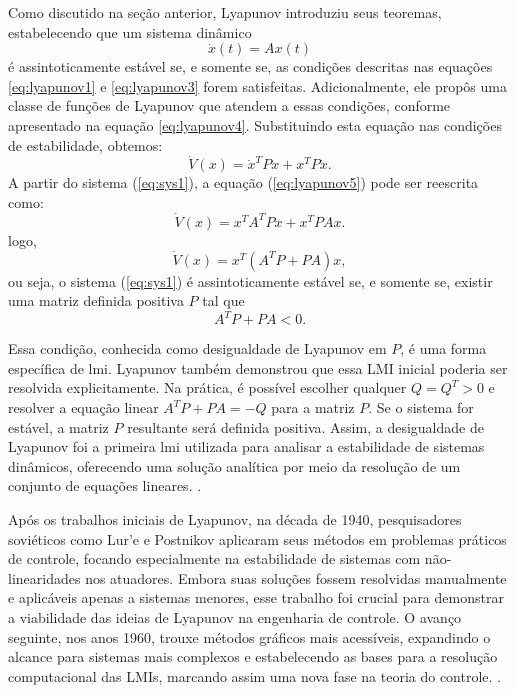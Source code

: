 Como discutido na seção anterior, Lyapunov introduziu seus teoremas, estabelecendo que um sistema dinâmico \begin{equation} \dot{x}(t) = Ax(t) \label{eq:sys1}\end{equation} é assintoticamente estável se, e somente se, as condições descritas nas equações \eqref{eq:lyapunov1} e \eqref{eq:lyapunov3} forem satisfeitas. Adicionalmente, ele propôs uma classe de funções de Lyapunov que atendem a essas condições, conforme apresentado na equação \eqref{eq:lyapunov4}. Substituindo esta equação nas condições de estabilidade, obtemos: \begin{equation} \dot{V}(x) = \dot{x}^TPx + x^TP\dot{x} \label{eq:lyapunov5}. \end{equation} A partir do sistema (\ref{eq:sys1}), a equação (\ref{eq:lyapunov5}) pode ser reescrita como: \begin{equation} \dot{V}(x) = x^TA^TPx + x^TPAx \label{eq:lyapunov6}. \end{equation} logo, \begin{equation} \dot{V}(x) = x^T (A^TP + PA) x \label{eq:lyapunov6}, \end{equation} ou seja, o sistema (\ref{eq:sys1}) é assintoticamente estável se, e somente se, existir uma matriz definida positiva $P$ tal que \begin{equation} A^T P + P A < 0.\end{equation}

Essa condição, conhecida como desigualdade de Lyapunov em $P$, é uma forma específica de \acrshort{lmi}. Lyapunov também demonstrou que essa LMI inicial poderia ser resolvida explicitamente. Na prática, é possível escolher qualquer $Q = Q^T > 0$ e resolver a equação linear $A^T P + P A = -Q$ para a matriz $P$. Se o sistema for estável, a matriz $P$ resultante será definida positiva. Assim, a desigualdade de Lyapunov foi a primeira \acrshort{lmi} utilizada para analisar a estabilidade de sistemas dinâmicos, oferecendo uma solução analítica por meio da resolução de um conjunto de equações lineares. \cite{lyapunov1892,boyd1994}.

Após os trabalhos iniciais de Lyapunov, na década de 1940, pesquisadores soviéticos como Lur'e e Postnikov aplicaram seus métodos em problemas práticos de controle, focando especialmente na estabilidade de sistemas com não-linearidades nos atuadores. Embora suas soluções fossem resolvidas manualmente e aplicáveis apenas a sistemas menores, esse trabalho foi crucial para demonstrar a viabilidade das ideias de Lyapunov na engenharia de controle. O avanço seguinte, nos anos 1960, trouxe métodos gráficos mais acessíveis, expandindo o alcance para sistemas mais complexos e estabelecendo as bases para a resolução computacional das LMIs, marcando assim uma nova fase na teoria do controle. \cite{boyd1994}.

